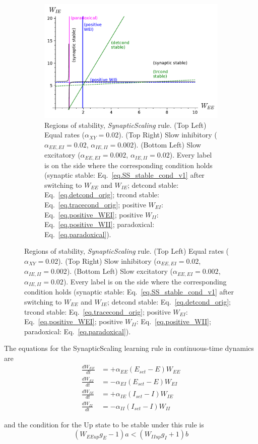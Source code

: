 \documentclass[twocolumn]{article}
\newcommand{\EE}{\mathit{EE}}
\newcommand{\EI}{\mathit{EI}}
\newcommand{\IE}{\mathit{IE}}
\newcommand{\II}{\mathit{II}}
\newcommand{\XY}{\mathit{XY}}
\newcommand{\set}{\mathit{set}}
\newcommand{\up}{\mathit{up}}
\begin{document}
\begin{figure}[!ht]
\parbox[c]{\columnwidth}{
\begin{figure}[H]
\includegraphics[width=\columnwidth]{SS_stability_slowInh.pdf}
\caption{Regions of stability, {\em SynapticScaling} rule. (Top Left) Equal rates ($\alpha_{\XY}=0.02$). (Top Right) Slow inhibitory ($\alpha_{\EE,\EI}=0.02$, $\alpha_{\IE,\II}=0.002$). (Bottom Left) Slow excitatory ($\alpha_{\EE,\EI}=0.002$, $\alpha_{\IE,\II}=0.02$). Every label is on the side where the  corresponding  condition  holds (synaptic stable: Eq.\ \ref{eq.SS_stable_cond_v1} after switching to $W_{\EE}$ and $W_{\IE}$; detcond stable: Eq.\ \ref{eq.detcond_orig}; trcond stable: Eq.\ \ref{eq.tracecond_orig}; positive $W_{\EI}$: Eq.\ \ref{eq.positive_WEI}; positive $W_{\II}$: Eq.\ \ref{eq.positive_WII}; paradoxical: Eq.\ \ref{eq.paradoxical}).}
\label{fig.SS_stability}
\end{figure}}
\end{figure}



The equations for the SynapticScaling learning rule in continuous-time dynamics are
\begin{equation}
\begin{aligned}
\frac{dW_{\EE}}{dt} & = +\alpha_{\EE} (E_{\set} - E) W_{\EE} \\
\frac{dW_{\EI}}{dt} & = -\alpha_{\EI} (E_{\set} - E) W_{\EI} \\
\frac{dW_{\IE}}{dt} & = +\alpha_{\IE} (I_{\set} - I) W_{\IE} \\
\frac{dW_{\II}}{dt} & = -\alpha_{\II} (I_{\set} - I) W_{\II}
\end{aligned}
\label{eq.SS_summary}
\end{equation}

\noindent and the condition for the Up state to be stable under this rule is
\begin{equation}
(W_{\EE\up}g_E - 1)a < (W_{\II\up}g_I + 1)b
\label{eq.SS_stable_cond_v1}
\end{equation}
\end{document}
